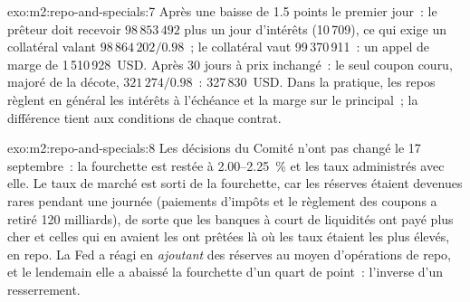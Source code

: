 \begin{solution}{exo:m2:repo-and-specials:7}
Après une baisse de 1.5 points le premier jour~: le prêteur doit recevoir $98\,853\,492$
plus un jour d'intérêts (10\,709), ce qui exige un collatéral valant
$98\,864\,202/0.98$~; le collatéral vaut 99\,370\,911~: un appel de marge de
1\,510\,928~USD. Après 30 jours à prix inchangé~: le seul coupon couru,
majoré de la décote, $321\,274/0.98$~: 327\,830~USD. Dans la pratique, les repos
règlent en général les intérêts à l'échéance et la marge sur le principal~; la
différence tient aux conditions de chaque contrat.
\end{solution}

\begin{solution}{exo:m2:repo-and-specials:8}
Les décisions du Comité n'ont pas changé le 17 septembre~: la fourchette est restée à
2.00--2.25~\% et les taux administrés avec elle. Le taux de marché est sorti de la
fourchette, car les réserves étaient devenues rares pendant une journée (paiements d'impôts et
le règlement des coupons a retiré 120 milliards), de sorte que les banques à court de liquidités ont payé plus cher et celles qui en avaient
les ont prêtées là où les taux étaient les plus élevés, en repo. La Fed a réagi en
\emph{ajoutant} des réserves au moyen d'opérations de repo, et le lendemain elle a abaissé la
fourchette d'un quart de point~: l'inverse d'un resserrement.
\end{solution}

